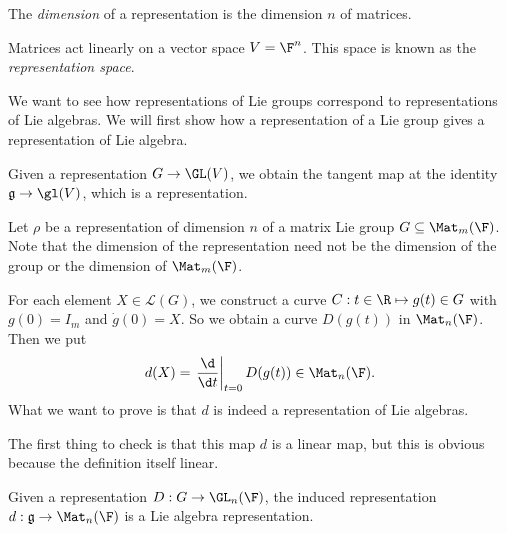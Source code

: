 \documentclass[a4paper]{article}
\begin{document}
\begin{defi}
  The \emph{dimension} of a representation is the dimension $n$ of matrices.
\end{defi}

\begin{defi}
  Matrices act linearly on a vector space $V = \F^n$. This space is known as the \emph{representation space}.
\end{defi}

We want to see how representations of Lie groups correspond to representations of Lie algebras. We will first show how a representation of a Lie group gives a representation of Lie algebra.

\begin{own}
  Given a representation $G \to \GL(V)$, we obtain the tangent map at the identity $\mathfrak{g} \to \gl(V)$, which is a representation.
\end{own}

Let $\rho$ be a representation of dimension $n$ of a matrix Lie group $G \subseteq \Mat_m(\F)$. Note that the dimension of the representation need not be the dimension of the group or the dimension of $\Mat_m(\F)$.

For each element $X \in \mathcal{L}(G)$, we construct a curve $C: t \in \R \mapsto g(t) \in G$ with $g(0) = I_m$ and $\dot{g}(0) = X$. So we obtain a curve $D(g(t))$ in $\Mat_n(\F)$. Then we put
\[
  d(X) = \left.\frac{\d}{\d t}\right|_{t = 0} D(g(t)) \in \Mat_n(\F).
\]
What we want to prove is that $d$ is indeed a representation of Lie algebras.

The first thing to check is that this map $d$ is a linear map, but this is obvious because the definition itself linear.
\begin{lemma}
  Given a representation $D: G \to \GL_n(\F)$, the induced representation $d: \mathfrak{g} \to \Mat_n(\F)$ is a Lie algebra representation.
\end{lemma}
\end{document}
